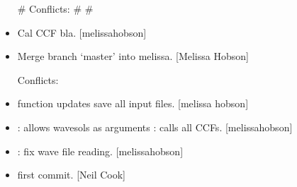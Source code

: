 \documentclass[a4paper,10pt,english]{report}
\begin{document}
\begin{itemize}
\# Conflicts:
\#    
\#    

\item {} 
Cal CCF bla. {[}melissa\sphinxhyphen{}hobson{]}

\item {} 
Merge branch ‘master’ into melissa. {[}Melissa Hobson{]}
\begin{description}
\item[{Conflicts:}] \leavevmode
{}

\end{description}

\item {} 
 function updates  save all input files. {[}melissa\sphinxhyphen{}
hobson{]}

\item {} 
: allows wavesols as arguments : calls all CCFs.
{[}melissa\sphinxhyphen{}hobson{]}

\item {} 
: fix wave file reading. {[}melissa\sphinxhyphen{}hobson{]}

\item {} 
 \sphinxhyphen{} first commit. {[}Neil Cook{]}

\end{itemize}
\end{document}

